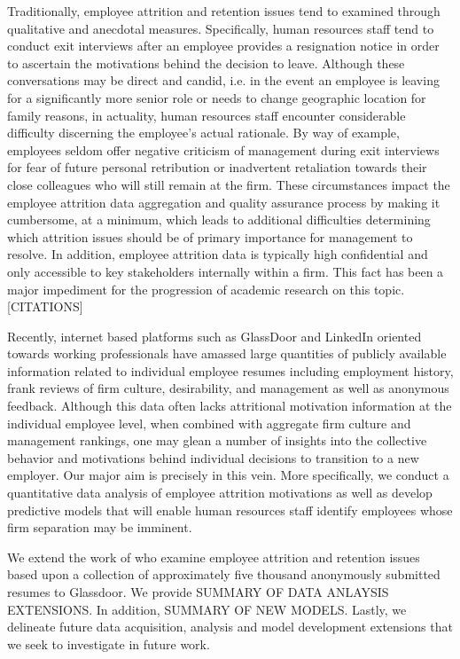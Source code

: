 \documentclass[10pt]{article}
\begin{document}
Traditionally, employee attrition and retention issues tend to examined through qualitative and anecdotal 
measures.  Specifically, human resources staff tend to conduct exit interviews after an employee provides 
a resignation notice in order to ascertain the motivations behind the decision to leave.  Although 
these conversations may be direct and candid, i.e. in the event an employee is leaving for a significantly 
more senior role or needs to change geographic location for family reasons, in actuality, human resources staff
encounter considerable difficulty discerning the employee's actual rationale.  By way of example, employees 
seldom offer negative criticism of management during exit interviews for fear of future personal retribution 
or inadvertent retaliation towards their close colleagues who will still remain at the firm.
These circumstances impact the employee attrition data aggregation and quality assurance process 
by making it cumbersome, at a minimum, which leads to additional difficulties determining which 
attrition issues should be of primary importance for management to resolve. In addition, employee 
attrition data is typically high confidential and only accessible to key stakeholders internally 
within a firm.  This fact has been a major impediment for the progression of academic research on 
this topic. [CITATIONS] 

Recently, internet based platforms such as GlassDoor and LinkedIn oriented towards working 
professionals have amassed large quantities of publicly available information related to individual 
employee resumes including employment history, frank reviews of firm culture, desirability, and management
as well as anonymous feedback.  Although this data often lacks attritional motivation information at 
the individual employee level, when combined with aggregate firm culture and management rankings, 
one may glean a number of insights into the collective behavior and motivations behind individual 
decisions to transition to a new employer. Our major aim is precisely in this vein.  More specifically, 
we conduct a quantitative data analysis of employee attrition motivations as well as develop 
predictive models that will enable human resources staff identify employees whose firm separation 
may be imminent.

We extend the work of \cite{Smart2016} who examine employee attrition and retention issues based upon 
a collection of approximately five thousand anonymously submitted resumes to Glassdoor.  We provide 
SUMMARY OF DATA ANLAYSIS EXTENSIONS.  In addition, SUMMARY OF NEW MODELS. Lastly, we delineate 
future data acquisition, analysis and model development extensions that we seek to investigate 
in future work. 
\end{document}
